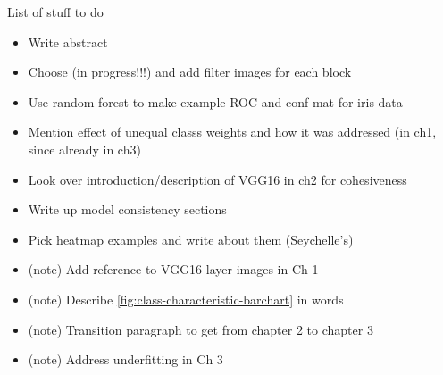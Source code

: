 
List of stuff to do

\begin{itemize}
\item Write abstract
\item Choose (in progress!!!) and add filter images for each block
\item Use random forest to make example ROC and conf mat for iris data
\item Mention effect of unequal classs weights and how it was addressed (in ch1, since already in ch3)
\item Look over introduction/description of VGG16 in ch2 for cohesiveness
\item Write up model consistency sections
\item Pick heatmap examples and write about them (Seychelle's)
\item (\fix note) Add reference to VGG16 layer images in Ch 1
\item (\fix note) Describe \autoref{fig:class-characteristic-barchart} in words
\item (\fix note) Transition paragraph to get from chapter 2 to chapter 3
\item (\fix note) Address underfitting in Ch 3
\end{itemize}
